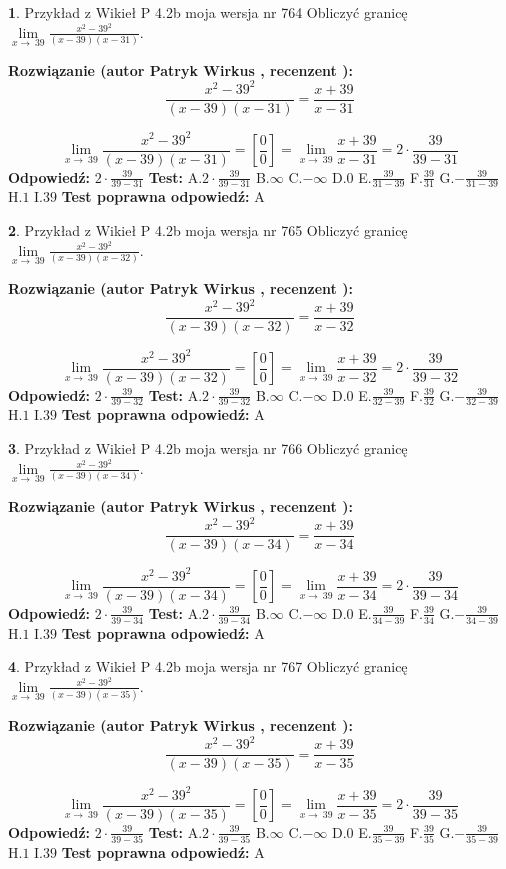 \documentclass[12pt, a4paper]{article}
\theoremstyle{definition} %
\newtheorem{zad}{}
\newcommand{\zadStart}[1]{\begin{zad}#1\newline}
\newcommand{\zadStop}{\end{zad}}
\newcommand{\rozwStart}[2]{\noindent \textbf{Rozwiązanie (autor #1 , recenzent #2): }\newline}
\newcommand{\rozwStop}{\newline}
\newcommand{\odpStart}{\noindent \textbf{Odpowiedź:}\newline}
\newcommand{\odpStop}{\newline}
\newcommand{\testStart}{\noindent \textbf{Test:}\newline}
\newcommand{\testStop}{\newline}
\newcommand{\kluczStart}{\noindent \textbf{Test poprawna odpowiedź:}\newline}
\newcommand{\kluczStop}{\newline}
\begin{document}
\zadStart{Przykład z Wikieł P 4.2b moja wersja nr 764}
Obliczyć granicę $\lim\limits_{x\to\ 39}\frac{x^{2}-39^{2}}{(x-39)(x-31)}$.
\zadStop
\rozwStart{Patryk Wirkus}{}
$$\frac{x^{2}-39^{2}}{(x-39)(x-31)}=\frac{x+39}{x-31}$$

$$\lim\limits_{x\to\ 39}\frac{x^{2}-39^{2}}{(x-39)(x-31)}=[\frac{0}{0}]=\lim\limits_{x\to\ 39}\frac{x+39}{x-31}=2 \cdot \frac{39}{39-31}$$
\rozwStop
\odpStart
$2 \cdot \frac{39}{39-31}$
\odpStop
\testStart
A.$2 \cdot \frac{39}{39-31}$
B.$\infty$
C.$-\infty$
D.$0$
E.$\frac{39}{31-39}$
F.$\frac{39}{31}$
G.$-\frac{39}{31-39}$
H.$1$
I.$39$
\testStop
\kluczStart
A
\kluczStop



\zadStart{Przykład z Wikieł P 4.2b moja wersja nr 765}
Obliczyć granicę $\lim\limits_{x\to\ 39}\frac{x^{2}-39^{2}}{(x-39)(x-32)}$.
\zadStop
\rozwStart{Patryk Wirkus}{}
$$\frac{x^{2}-39^{2}}{(x-39)(x-32)}=\frac{x+39}{x-32}$$

$$\lim\limits_{x\to\ 39}\frac{x^{2}-39^{2}}{(x-39)(x-32)}=[\frac{0}{0}]=\lim\limits_{x\to\ 39}\frac{x+39}{x-32}=2 \cdot \frac{39}{39-32}$$
\rozwStop
\odpStart
$2 \cdot \frac{39}{39-32}$
\odpStop
\testStart
A.$2 \cdot \frac{39}{39-32}$
B.$\infty$
C.$-\infty$
D.$0$
E.$\frac{39}{32-39}$
F.$\frac{39}{32}$
G.$-\frac{39}{32-39}$
H.$1$
I.$39$
\testStop
\kluczStart
A
\kluczStop



\zadStart{Przykład z Wikieł P 4.2b moja wersja nr 766}
Obliczyć granicę $\lim\limits_{x\to\ 39}\frac{x^{2}-39^{2}}{(x-39)(x-34)}$.
\zadStop
\rozwStart{Patryk Wirkus}{}
$$\frac{x^{2}-39^{2}}{(x-39)(x-34)}=\frac{x+39}{x-34}$$

$$\lim\limits_{x\to\ 39}\frac{x^{2}-39^{2}}{(x-39)(x-34)}=[\frac{0}{0}]=\lim\limits_{x\to\ 39}\frac{x+39}{x-34}=2 \cdot \frac{39}{39-34}$$
\rozwStop
\odpStart
$2 \cdot \frac{39}{39-34}$
\odpStop
\testStart
A.$2 \cdot \frac{39}{39-34}$
B.$\infty$
C.$-\infty$
D.$0$
E.$\frac{39}{34-39}$
F.$\frac{39}{34}$
G.$-\frac{39}{34-39}$
H.$1$
I.$39$
\testStop
\kluczStart
A
\kluczStop



\zadStart{Przykład z Wikieł P 4.2b moja wersja nr 767}
Obliczyć granicę $\lim\limits_{x\to\ 39}\frac{x^{2}-39^{2}}{(x-39)(x-35)}$.
\zadStop
\rozwStart{Patryk Wirkus}{}
$$\frac{x^{2}-39^{2}}{(x-39)(x-35)}=\frac{x+39}{x-35}$$

$$\lim\limits_{x\to\ 39}\frac{x^{2}-39^{2}}{(x-39)(x-35)}=[\frac{0}{0}]=\lim\limits_{x\to\ 39}\frac{x+39}{x-35}=2 \cdot \frac{39}{39-35}$$
\rozwStop
\odpStart
$2 \cdot \frac{39}{39-35}$
\odpStop
\testStart
A.$2 \cdot \frac{39}{39-35}$
B.$\infty$
C.$-\infty$
D.$0$
E.$\frac{39}{35-39}$
F.$\frac{39}{35}$
G.$-\frac{39}{35-39}$
H.$1$
I.$39$
\testStop
\kluczStart
A
\kluczStop
\end{document}
